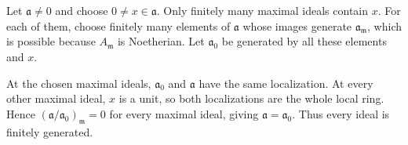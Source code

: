 Let $\mathfrak{a}\ne0$ and choose $0\ne x\in\mathfrak{a}$. Only finitely many maximal ideals contain $x$. For each of them, choose finitely many elements of $\mathfrak{a}$ whose images generate $\mathfrak{a}_{\mathfrak{m}}$, which is possible because $A_{\mathfrak{m}}$ is Noetherian. Let $\mathfrak{a}_0$ be generated by all these elements and $x$.

At the chosen maximal ideals, $\mathfrak{a}_0$ and $\mathfrak{a}$ have the same localization. At every other maximal ideal, $x$ is a unit, so both localizations are the whole local ring. Hence $(\mathfrak{a}/\mathfrak{a}_0)_{\mathfrak{m}}=0$ for every maximal ideal, giving $\mathfrak{a}=\mathfrak{a}_0$. Thus every ideal is finitely generated.
